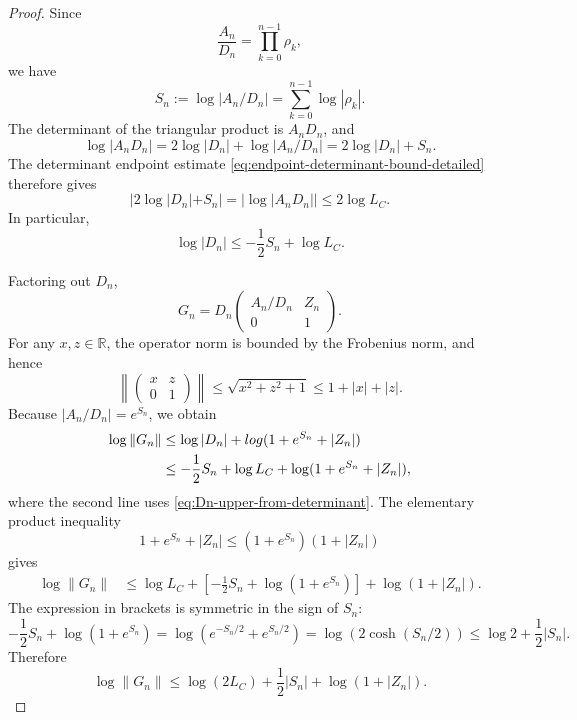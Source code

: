 \documentclass[11pt,a4paper]{amsart}
\theoremstyle{definition}
\theoremstyle{remark}
\numberwithin{equation}{section}
\newcommand{\RR}{\mathbb R}
\newcommand{\1}{\boldsymbol 1}
\begin{document}
\begin{proof}
Since
$$
 \frac{A_n}{D_n}=\prod_{k=0}^{n-1}\rho_k,
$$
we have
\begin{equation}\label{eq:triangular-Sn-definition}
 S_n:=\log|A_n/D_n|
 =\sum_{k=0}^{n-1}\log|\rho_k|.
\end{equation}
The determinant of the triangular product is $A_nD_n$, and
$$
 \log|A_nD_n|
 =2\log|D_n|+\log|A_n/D_n|
 =2\log|D_n|+S_n.
$$
The determinant endpoint estimate
\eqref{eq:endpoint-determinant-bound-detailed} therefore gives
\begin{equation}\label{eq:triangular-determinant-expanded}
 |2\log|D_n|+S_n|
 =|\log|A_nD_n||\le2\log L_C.
\end{equation}
In particular,
\begin{equation}\label{eq:Dn-upper-from-determinant}
 \log|D_n|\le-\frac12S_n+\log L_C.
\end{equation}

%
Factoring out $D_n$,
$$
 G_n=D_n
 \begin{pmatrix}A_n/D_n&Z_n\\0&1\end{pmatrix}.
$$
For any $x,z\in\RR$, the operator norm is bounded by the Frobenius
norm, and hence
$$
 \left\|\begin{pmatrix}x&z\\0&1\end{pmatrix}\right\|
 \le\sqrt{x^2+z^2+1}
 \le1+|x|+|z|.
$$
Because $|A_n/D_n|=e^{S_n}$, we obtain
\begin{align}
 \log\|G_n\|
 &\le\log|D_n|+log(1+e^{S_n}+|Z_n|)\notag\\
 &\le-\frac12S_n+\log L_C
       +\log(1+e^{S_n}+|Z_n|),
 \label{eq:triangular-pre-split}
\end{align}
where the second line uses \eqref{eq:Dn-upper-from-determinant}.
The elementary product inequality
$$
 1+e^{S_n}+|Z_n|
 \le(1+e^{S_n})(1+|Z_n|)
$$
gives
\begin{align*}
 \log\|G_n\|
 &\le \log L_C
 +\left[-\frac12S_n+\log(1+e^{S_n})\right]
 +\log(1+|Z_n|).
\end{align*}
The expression in brackets is symmetric in the sign of $S_n$:
$$
 -\frac12S_n+\log(1+e^{S_n})
 =\log(e^{-S_n/2}+e^{S_n/2})
 =\log(2\cosh(S_n/2))
 \le\log2+\frac12|S_n|.
$$
Therefore
\begin{equation}\label{eq:triangular-norm-expanded}
 \log\|G_n\|
 \le \log(2L_C)+\frac12|S_n|+\log(1+|Z_n|).
\end{equation}



\end{proof}
\end{document}
